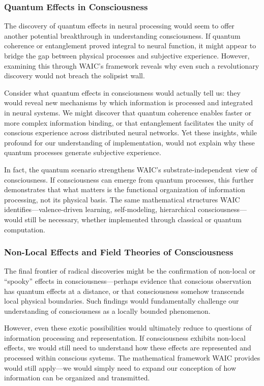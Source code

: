 \documentclass[12pt]{article}
\begin{document}
\subsubsection{Quantum Effects in Consciousness}

The discovery of quantum effects in neural processing would seem to offer another potential breakthrough in understanding consciousness. If quantum coherence or entanglement proved integral to neural function, it might appear to bridge the gap between physical processes and subjective experience. However, examining this through WAIC's framework reveals why even such a revolutionary discovery would not breach the solipsist wall.

Consider what quantum effects in consciousness would actually tell us: they would reveal new mechanisms by which information is processed and integrated in neural systems. We might discover that quantum coherence enables faster or more complex information binding, or that entanglement facilitates the unity of conscious experience across distributed neural networks. Yet these insights, while profound for our understanding of implementation, would not explain why these quantum processes generate subjective experience.

In fact, the quantum scenario strengthens WAIC's substrate-independent view of consciousness. If consciousness can emerge from quantum processes, this further demonstrates that what matters is the functional organization of information processing, not its physical basis. The same mathematical structures WAIC identifies---valence-driven learning, self-modeling, hierarchical consciousness---would still be necessary, whether implemented through classical or quantum computation.

\subsubsection{Non-Local Effects and Field Theories of Consciousness}

The final frontier of radical discoveries might be the confirmation of non-local or ``spooky'' effects in consciousness---perhaps evidence that conscious observation has quantum effects at a distance, or that consciousness somehow transcends local physical boundaries. Such findings would fundamentally challenge our understanding of consciousness as a locally bounded phenomenon.

However, even these exotic possibilities would ultimately reduce to questions of information processing and representation. If consciousness exhibits non-local effects, we would still need to understand how these effects are represented and processed within conscious systems. The mathematical framework WAIC provides would still apply---we would simply need to expand our conception of how information can be organized and transmitted.
\end{document}
